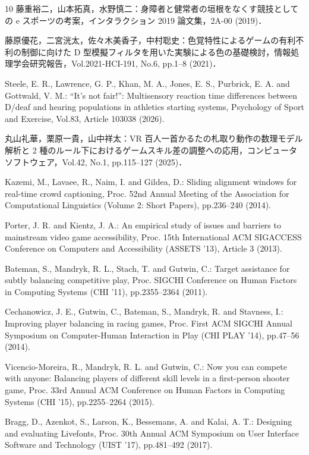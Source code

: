 \begin{thebibliography}{10}
藤重裕二，山本拓真，水野慎二：身障者と健常者の垣根をなくす競技としての e スポーツの考案，インタラクション 2019 論文集，2A-00 (2019)．

藤原優花，二宮洸太，佐々木美香子，中村聡史：色覚特性によるゲームの有利不利の制御に向けた D 型模擬フィルタを用いた実験による色の基礎検討，情報処理学会研究報告，Vol.2021-HCI-191, No.6, pp.1--8 (2021)．

Steele, E. R., Lawrence, G. P., Khan, M. A., Jones, E. S., Purbrick, E. A. and Gottwald, V. M.: ``It's not fair!'': Multisensory reaction time differences between D/deaf and hearing populations in athletics starting systems, Psychology of Sport and Exercise, Vol.83, Article 103038 (2026).

丸山礼華，栗原一貴，山中祥太：VR 百人一首かるたの札取り動作の数理モデル解析と 2 種のルール下におけるゲームスキル差の調整への応用，コンピュータソフトウェア，Vol.42, No.1, pp.115--127 (2025)．

Kazemi, M., Lavaee, R., Naim, I. and Gildea, D.: Sliding alignment windows for real-time crowd captioning, Proc. 52nd Annual Meeting of the Association for Computational Linguistics (Volume 2: Short Papers), pp.236--240 (2014).

Porter, J. R. and Kientz, J. A.: An empirical study of issues and barriers to mainstream video game accessibility, Proc. 15th International ACM SIGACCESS Conference on Computers and Accessibility (ASSETS '13), Article 3 (2013).

Bateman, S., Mandryk, R. L., Stach, T. and Gutwin, C.: Target assistance for subtly balancing competitive play, Proc. SIGCHI Conference on Human Factors in Computing Systems (CHI '11), pp.2355--2364 (2011).

Cechanowicz, J. E., Gutwin, C., Bateman, S., Mandryk, R. and Stavness, I.: Improving player balancing in racing games, Proc. First ACM SIGCHI Annual Symposium on Computer-Human Interaction in Play (CHI PLAY '14), pp.47--56 (2014).

Vicencio-Moreira, R., Mandryk, R. L. and Gutwin, C.: Now you can compete with anyone: Balancing players of different skill levels in a first-person shooter game, Proc. 33rd Annual ACM Conference on Human Factors in Computing Systems (CHI '15), pp.2255--2264 (2015).

Bragg, D., Azenkot, S., Larson, K., Bessemans, A. and Kalai, A. T.: Designing and evaluating Livefonts, Proc. 30th Annual ACM Symposium on User Interface Software and Technology (UIST '17), pp.481--492 (2017).


\end{thebibliography}
